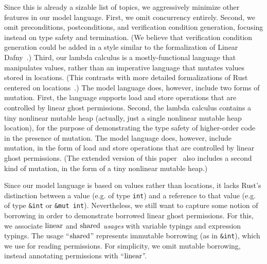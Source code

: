 Since this is already a sizable list of topics,
we aggressively minimize other features in our model language.
First, we omit concurrency entirely.
Second, we omit preconditions, postconditions, and verification condition generation,
focusing instead on type safety and termination.
(We believe that verification condition generation could be added
in a style similar to the formalization of Linear Dafny~\cite{DBLP:journals/pacmpl/LiLZCHPH22}.)
Third, our lambda calculus is a mostly-functional language that manipulates values,
rather than an imperative language that mutates values stored in locations.
(This contrasts with more detailed formalizations of Rust centered on
locations~\cite{pearce-rust-toplas2021, DBLP:journals/corr/abs-1903-00982}.)
\ifextended
The model language does, however, include two forms of mutation.
First, the language supports load and store operations that are controlled by linear ghost permissions.
Second, the lambda calculus contains a tiny nonlinear mutable heap
(actually, just a single nonlinear mutable heap location),
for the purpose of demonstrating the type safety of higher-order code in the presence of mutation.
\else
The model language does, however, include mutation,
in the form of load and store operations that are controlled by linear ghost permissions.
(The extended version of this paper~\cite{verus2023extended} also includes a second kind of mutation,
in the form of a tiny nonlinear mutable heap.)
\fi

Since our model language is based on values rather than locations,
it lacks Rust's distinction between a value (e.g. of type \verb`int`)
and a reference to that value (e.g. of type \verb`&int` or \verb`&mut int`).
Nevertheless, we still want to capture some notion of borrowing in order to demonstrate
borrowed linear ghost permissions.
For this, we associate $\textrm{linear}$ and $\textrm{shared}$ {\it usages}
with variable typings and expression typings.
The usage ``$\textrm{shared}$'' represents immutable borrowing (as in \verb`&int`),
which we use for reading permissions.
For simplicity, we omit mutable borrowing,
instead annotating permissions with ``$\textrm{linear}$''.

